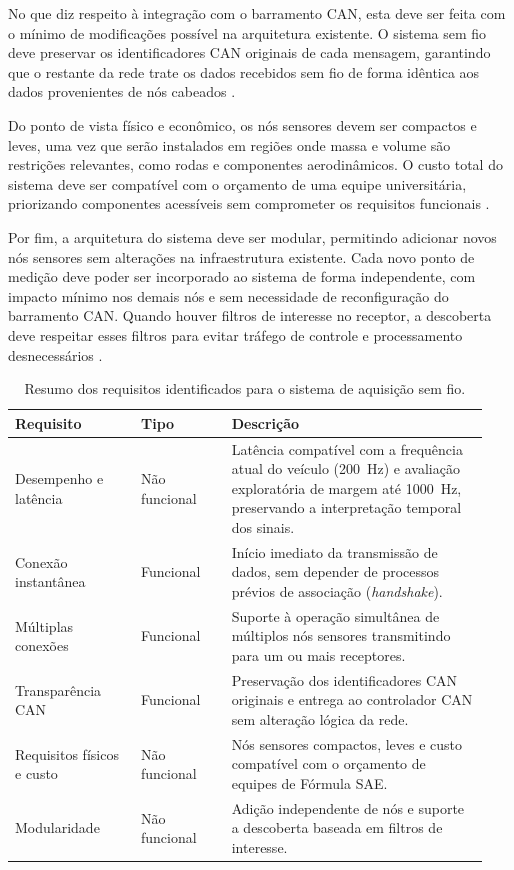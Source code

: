 No que diz respeito à integração com o barramento CAN, esta deve ser feita
com o mínimo de modificações possível na arquitetura existente. O sistema sem
fio deve preservar os identificadores CAN originais de cada mensagem, garantindo que o restante da rede trate os dados
recebidos sem fio de forma idêntica aos dados provenientes de nós cabeados
\cite{iso11898_1_2024,silva2009_rede_can_formula_sae}.

Do ponto de vista físico e econômico, os nós sensores devem ser compactos e
leves, uma vez que serão instalados em regiões onde massa e volume são
restrições relevantes, como rodas e componentes aerodinâmicos. O custo total
do sistema deve ser compatível com o orçamento de uma equipe universitária,
priorizando componentes acessíveis sem comprometer os requisitos funcionais
\cite{stoffman2004_low_cost_racing_daq,david2025_formula_sae_daq}.

Por fim, a arquitetura do sistema deve ser modular, permitindo adicionar
novos nós sensores sem alterações na infraestrutura existente. Cada novo
ponto de medição deve poder ser incorporado ao sistema de forma independente,
com impacto mínimo nos demais nós e sem necessidade de reconfiguração do
barramento CAN. Quando houver filtros de interesse no receptor, a descoberta
deve respeitar esses filtros para evitar tráfego de controle e processamento
desnecessários \cite{rahman2017_intravehicular_wsn}.

\begin{table}[htbp]
\centering
\small
\setlength{\tabcolsep}{4pt}
\renewcommand{\arraystretch}{1.12}
\begin{tabular}{p{0.25\linewidth}|p{0.18\linewidth}|p{0.51\linewidth}}
\hline
Requisito & Tipo & Descrição \\
\hline
Desempenho e latência & Não funcional & Latência compatível com a frequência atual do veículo (200~Hz) e avaliação exploratória de margem até 1000~Hz, preservando a interpretação temporal dos sinais. \\
\hline
Conexão instantânea & Funcional & Início imediato da transmissão de dados, sem depender de processos prévios de associação (\emph{handshake}). \\
\hline
Múltiplas conexões & Funcional & Suporte à operação simultânea de múltiplos nós sensores transmitindo para um ou mais receptores. \\
\hline
Transparência CAN & Funcional & Preservação dos identificadores CAN originais e entrega ao controlador CAN sem alteração lógica da rede. \\
\hline
Requisitos físicos e custo & Não funcional & Nós sensores compactos, leves e custo compatível com o orçamento de equipes de Fórmula SAE. \\
\hline
Modularidade & Não funcional & Adição independente de nós e suporte a descoberta baseada em filtros de interesse. \\
\hline
\end{tabular}
\caption{Resumo dos requisitos identificados para o sistema de aquisição sem fio.}
\label{tab:requisitos-identificados}
\end{table}
